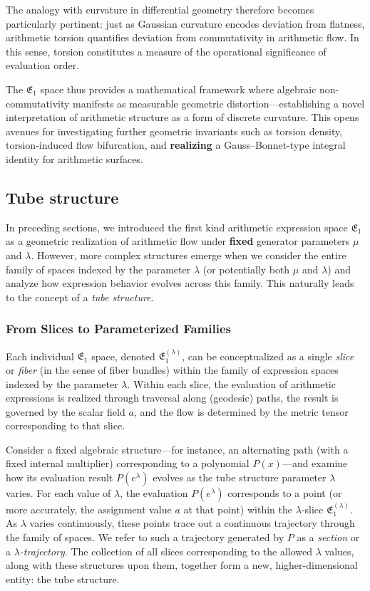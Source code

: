 The analogy with curvature in differential geometry therefore becomes particularly pertinent: just as Gaussian curvature encodes deviation from flatness, arithmetic torsion quantifies deviation from commutativity in arithmetic flow. In this sense, torsion constitutes a measure of the operational significance of evaluation order.

The $\mathfrak{E}_1$ space thus provides a mathematical framework where algebraic non-commutativity manifests as measurable geometric distortion—establishing a novel interpretation of arithmetic structure as a form of discrete curvature. This opens avenues for investigating further geometric invariants such as torsion density, torsion-induced flow bifurcation, and \textbf{realizing} a Gauss–Bonnet-type integral identity for arithmetic surfaces.

\subsection{Tube structure}\label{sec:tubestructure}

In preceding sections, we introduced the first kind arithmetic expression space $\mathfrak{E}_1$ as a geometric realization of arithmetic flow under \textbf{fixed} generator parameters $\mu$ and $\lambda$. However, more complex structures emerge when we consider the entire family of spaces indexed by the parameter $\lambda$ (or potentially both $\mu$ and $\lambda$) and analyze how expression behavior evolves across this family. This naturally leads to the concept of a \emph{tube structure}.

\subsubsection{From Slices to Parameterized Families}\label{subsec:tube_slices}

Each individual $\mathfrak{E}_1$ space, denoted $\mathfrak{E}_1^{(\lambda)}$, can be conceptualized as a single \emph{slice} or \emph{fiber} (in the sense of fiber bundles) within the family of expression spaces indexed by the parameter $\lambda$. Within each slice, the evaluation of arithmetic expressions is realized through traversal along (geodesic) paths, the result is governed by the scalar field $a$, and the flow is determined by the metric tensor corresponding to that slice.

Consider a fixed algebraic structure—for instance, an alternating path (with a fixed internal multiplier) corresponding to a polynomial $P(x)$—and examine how its evaluation result $P(e^\lambda)$ evolves as the tube structure parameter $\lambda$ varies. For each value of $\lambda$, the evaluation $P(e^\lambda)$ corresponds to a point (or more accurately, the assignment value $a$ at that point) within the $\lambda$-slice $\mathfrak{E}_1^{(\lambda)}$. As $\lambda$ varies continuously, these points trace out a continuous trajectory through the family of spaces. We refer to such a trajectory generated by $P$ as a \emph{section} or a \emph{$\lambda$-trajectory}. The collection of all slices corresponding to the allowed $\lambda$ values, along with these structures upon them, together form a new, higher-dimensional entity: the tube structure.

